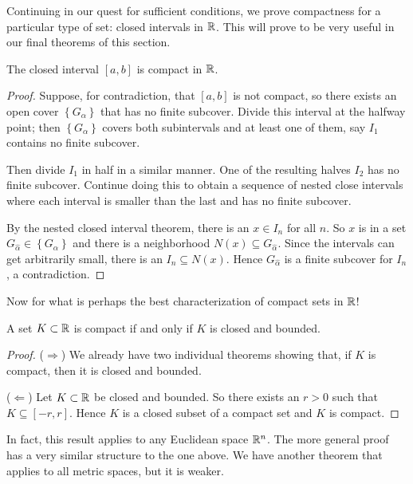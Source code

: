 \documentclass[../m131main.tex]{subfiles}
\begin{document}
Continuing in our quest for sufficient conditions, we prove compactness for a particular type of set: closed intervals in $\mathbb{R}$.
This will prove to be very useful in our final theorems of this section.

\begin{theorem}[]
    The closed interval $[a,b]$ is compact in $\mathbb{R}$.
\end{theorem}

\begin{proof}
    Suppose, for contradiction, that $[a,b]$ is not compact, so there exists an open cover $\left\{ G_\alpha \right\}$ that has no finite subcover.
    Divide this interval at the halfway point; then $\left\{ G_\alpha \right\}$ covers both subintervals and at least one of them, say $I_1$ contains no finite subcover.

    Then divide $I_1$ in half in a similar manner.
    One of the resulting halves $I_2$ has no finite subcover.
    Continue doing this to obtain a sequence of nested close intervals where each interval is smaller than the last and has no finite subcover.

    By the nested closed interval theorem, there is an $x \in I_n$ for all $n$.
    So $x$ is in a set $G_{\hat \alpha} \in \left\{ G_\alpha \right\}$ and there is a neighborhood $N(x) \subseteq G_{\hat \alpha}$.
    Since the intervals can get arbitrarily small, there is an $I_n \subseteq N(x)$.
    Hence $G_{\hat \alpha}$ is a finite subcover for $I_n$, a contradiction.
\end{proof}

Now for what is perhaps the best characterization of compact sets in $\mathbb{R}$!

\begin{theorem}
    A set $K \subset \mathbb{R}$ is compact if and only if $K$ is closed and bounded.
\end{theorem}

\begin{proof}
    ($\Rightarrow$)
    We already have two individual theorems showing that, if $K$ is compact, then it is closed and bounded.
    \smallskip

    ($\Leftarrow$)
    Let $K \subset \mathbb{R}$ be closed and bounded.
    So there exists an $r > 0$ such that $K \subseteq [-r, r]$.
    Hence $K$ is a closed subset of a compact set and $K$ is compact.
\end{proof}

In fact, this result applies to any Euclidean space $\mathbb{R}^n$.
The more general proof has a very similar structure to the one above.
We have another theorem that applies to all metric spaces, but it is weaker.
\end{document}
